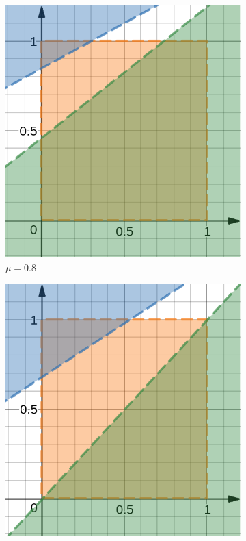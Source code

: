 \begin{flushleft}
	\begin{figure}[h]
    	\centering
     	\begin{subfigure}[b]{0.22 \textwidth}
        	\centering
        	\includegraphics[width=\textwidth]{images/graf_6_1}
        	\caption{$\mu=0.8$}
         	\label{fig:y equals x}
     	\end{subfigure}
     	\hfill
     	\begin{subfigure}[b]{0.22 \textwidth}
        	\centering
        	\includegraphics[width=\textwidth]{images/graf_6_2}

\end{subfigure}
\end{figure}
\end{flushleft}
